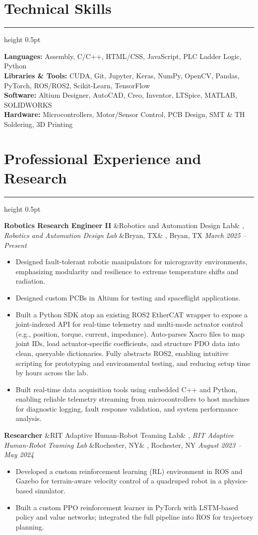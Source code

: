 \documentclass[letterpaper,10pt]{article}
\newcommand{\heading}[1]{%
    \vspace{-5mm} %
    \section*{#1}%
    \vspace{-3mm}%
    \noindent\hrule height 0.5pt %
    \vspace{4mm}%
}
\newcommand{\experience}[5]{%
    \noindent\textbf{#1}%
    \ifx&#2&
    \else
        , \textit{#2}%
    \fi
    \ifx&#3&
    \else
        , #3%
    \fi
    \hfill \textit{#4} \\
    \vspace{-6.8mm}%
    \begin{itemize}[itemsep=-5pt]
        \setlength{\itemindent}{0em}
        #5
    \end{itemize}
    \vspace{1mm}
}
\begin{document}
\heading{Technical Skills}
\vspace{-1mm}%
\noindent\textbf{Languages:} Assembly, C/C++, HTML/CSS, JavaScript, PLC Ladder Logic, Python \\
\textbf{Libraries \& Tools:} CUDA, Git, Jupyter, Keras, NumPy, OpenCV, Pandas, PyTorch, ROS/ROS2, Scikit-Learn, TensorFlow \\
\textbf{Software:} Altium Designer, AutoCAD, Creo, Inventor, LTSpice, MATLAB, SOLIDWORKS \\
\textbf{Hardware:} Microcontrollers, Motor/Sensor Control, PCB Design, SMT \& TH Soldering, 3D Printing \\


\heading{Professional Experience and Research}

\experience
    {Robotics Research Engineer II}
    {Robotics and Automation Design Lab}
    {Bryan, TX}
    {March 2025 – Present}
    {
        \item Designed fault-tolerant robotic manipulators for microgravity environments, emphasizing modularity and resilience to extreme temperature shifts and radiation.
        \item Designed custom PCBs in Altium for testing and spaceflight applications.
        \item Built a Python SDK atop an existing ROS2 EtherCAT wrapper to expose a joint-indexed API for real-time telemetry and multi-mode actuator control (e.g., position, torque, current, impedance). Auto-parses Xacro files to map joint IDs, load actuator-specific coefficients, and structure PDO data into clean, queryable dictionaries. Fully abstracts ROS2, enabling intuitive scripting for prototyping and environmental testing, and reducing setup time by hours across the lab.
        \item Built real-time data acquisition tools using embedded C++ and Python, enabling reliable telemetry streaming from microcontrollers to host machines for diagnostic logging, fault response validation, and system performance analysis.

    }

\experience
    {Researcher}
    {RIT Adaptive Human-Robot Teaming Lab}
    {Rochester, NY}
    {August 2023 – May 2024}
    {
        \item  Developed a custom reinforcement learning (RL) environment in ROS and Gazebo for terrain-aware velocity control of a quadruped robot in a physics-based simulator.
        \item  Built a custom PPO reinforcement learner in PyTorch with LSTM-based policy and value networks; integrated the full pipeline into ROS for trajectory planning.
    }
    
\end{document}
